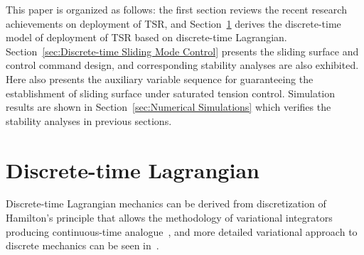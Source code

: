 \documentclass[10pt,final,journal]{IEEEtran}
\begin{document}
This paper is organized as follows: the first section reviews the recent research achievements on deployment of TSR, and Section~\ref{sec:Discrete-time Lagrangian} derives the discrete-time model of deployment of TSR based on discrete-time Lagrangian. Section~\ref{sec:Discrete-time Sliding Mode Control} presents the sliding surface and control command design, and corresponding stability analyses are also exhibited. Here also presents the auxiliary variable sequence for guaranteeing the establishment of sliding surface under saturated tension control. Simulation results are shown in Section~\ref{sec:Numerical Simulations} which verifies the stability analyses in previous sections.

\section{Discrete-time Lagrangian}\label{sec:Discrete-time Lagrangian} 
Discrete-time Lagrangian mechanics can be derived from discretization of Hamilton's principle that allows the methodology of variational integrators producing continuous-time analogue~\cite{Bloch2005Controlled}, 
and more detailed  variational approach to discrete mechanics can be seen in~\cite{Marsden2001Discrete}. 
\end{document}
